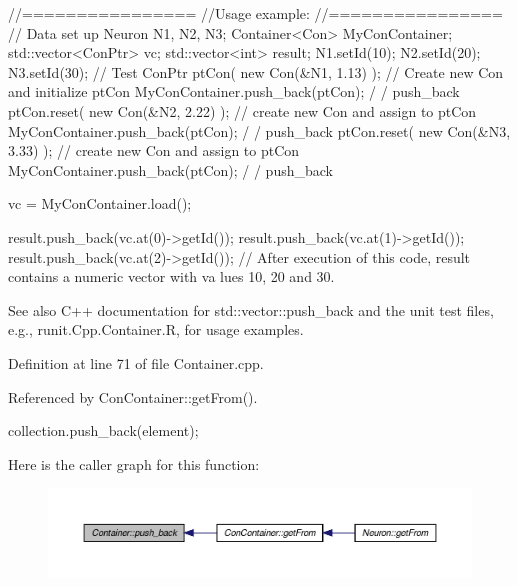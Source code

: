 \begin{DoxyCode}
                //================
                //Usage example:
                //================
                // Data set up
                        Neuron N1, N2, N3;
                        Container<Con> MyConContainer;
                        std::vector<ConPtr> vc;
                        std::vector<int> result;
                        N1.setId(10);
                        N2.setId(20);
                        N3.setId(30);
                // Test
                        ConPtr ptCon( new Con(&N1, 1.13) );     // Create new Con
       and initialize ptCon
                        MyConContainer.push_back(ptCon);                                /
      / push_back
                        ptCon.reset(  new Con(&N2, 2.22) );             // create
       new Con and assign to ptCon
                        MyConContainer.push_back(ptCon);                                /
      / push_back
                        ptCon.reset(  new Con(&N3, 3.33) );             // create
       new Con and assign to ptCon
                        MyConContainer.push_back(ptCon);                                /
      / push_back

                        vc = MyConContainer.load();

                        result.push_back(vc.at(0)->getId());
                        result.push_back(vc.at(1)->getId());
                        result.push_back(vc.at(2)->getId());
        // After execution of this code, result contains a numeric vector with va
      lues 10, 20 and 30.
\end{DoxyCode}


\begin{DoxySeeAlso}{See also}
C++ documentation for std::vector::push\_\-back and the unit test files, e.g., runit.Cpp.Container.R, for usage examples. 
\end{DoxySeeAlso}


Definition at line 71 of file Container.cpp.



Referenced by ConContainer::getFrom().


\begin{DoxyCode}
  {
    collection.push_back(element);
  }
\end{DoxyCode}


Here is the caller graph for this function:
\nopagebreak
\begin{figure}[H]
\begin{center}
\leavevmode
\includegraphics[width=400pt]{class_container_afd87c69cb799ed7b434c29090083a285_icgraph}
\end{center}
\end{figure}


